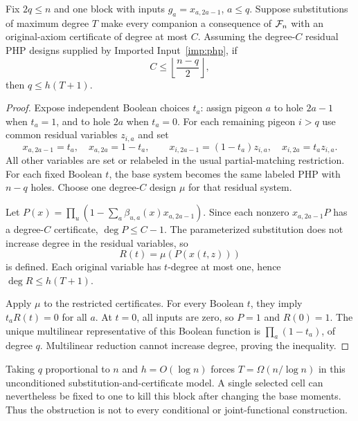 \begin{lemma}\label{lem:certificatebarrier}
Fix $2q\le n$ and one block with inputs $g_a=x_{a,2a-1}$, $a\le q$. Suppose substitutions of maximum degree $T$ make every companion a consequence of $\mathcal F_n$ with an original-axiom certificate of degree at most $C$. Assuming the degree-$C$ residual PHP designs supplied by Imported Input~\ref{imp:php}, if
\[
 C\le\left\lfloor\frac{n-q}{2}\right\rfloor,
\]
then $q\le h(T+1)$.
\end{lemma}
\begin{proof}
Expose independent Boolean choices $t_a$: assign pigeon $a$ to hole $2a-1$ when $t_a=1$, and to hole $2a$ when $t_a=0$. For each remaining pigeon $i>q$ use common residual variables $z_{i,a}$ and set
\[
 x_{a,2a-1}=t_a,\quad x_{a,2a}=1-t_a,\qquad
 x_{i,2a-1}=(1-t_a)z_{i,a},\quad x_{i,2a}=t_a z_{i,a}.
\]
All other variables are set or relabeled in the usual partial-matching restriction. For each fixed Boolean $t$, the base system becomes the same labeled PHP with $n-q$ holes. Choose one degree-$C$ design $\mu$ for that residual system.

Let $P(x)=\prod_u(1-\sum_a\beta_{u,a}(x)x_{a,2a-1})$. Since each nonzero $x_{a,2a-1}P$ has a degree-$C$ certificate, $\deg P\le C-1$. The parameterized substitution does not increase degree in the residual variables, so
\[
 R(t)=\mu(P(x(t,z)))
\]
is defined. Each original variable has $t$-degree at most one, hence $\deg R\le h(T+1)$.

Apply $\mu$ to the restricted certificates. For every Boolean $t$, they imply $t_aR(t)=0$ for all $a$. At $t=0$, all inputs are zero, so $P=1$ and $R(0)=1$. The unique multilinear representative of this Boolean function is $\prod_a(1-t_a)$, of degree $q$. Multilinear reduction cannot increase degree, proving the inequality.
\end{proof}

\begin{remark}
Taking $q$ proportional to $n$ and $h=O(\log n)$ forces $T=\Omega(n/\log n)$ in this unconditioned substitution-and-certificate model. A single selected cell can nevertheless be fixed to one to kill this block after changing the base moments. Thus the obstruction is not to every conditional or joint-functional construction.
\end{remark}
